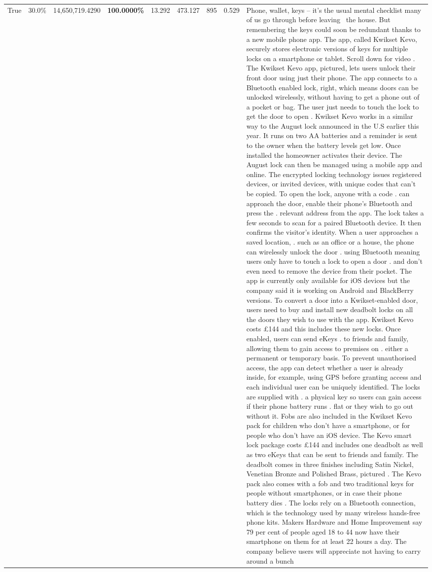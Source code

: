 \begin{table}[H]
\begin{tabular}{lllrlllll}
True & 30.0\% & 14,650,719.4290 & \bfseries \color{red} 100.0000\% & 13.292 & 473.127 & 895 & 0.529 & Phone, wallet, keys – it’s the usual mental checklist many of us go through before leaving  the house. But remembering the keys could soon be redundant thanks to a new mobile phone app. The app, called Kwikset Kevo, securely stores electronic versions of keys for multiple locks on a smartphone or tablet. Scroll down for video . The Kwikset Kevo app, pictured, lets users unlock their front door using just their phone. The app connects to a Bluetooth enabled lock, right, which means doors can be unlocked wirelessly, without having to get a phone out of a pocket or bag. The user just needs to touch the lock to get the door to open . Kwikset Kevo works in a similar way to the August lock announced in the U.S earlier this year. It runs on two AA batteries and a reminder is sent to the owner when the battery levels get low. Once installed the homeowner activates their device. The August lock can then be managed using a mobile app and online. The encrypted locking technology issues registered devices, or invited devices, with unique codes that can't be copied. To open the lock, anyone with a code . can approach the door, enable their phone's Bluetooth and press the . relevant address from the app. The lock takes a few seconds to scan for a paired Bluetooth device. It then confirms the visitor's identity. When a user approaches a saved location, . such as an office or a house, the phone can wirelessly unlock the door . using Bluetooth meaning users only have to touch a lock to open a door . and don't even need to remove the device from their pocket. The app is currently only available for iOS devices but the company said it is working on Android and BlackBerry versions. To convert a door into a Kwikset-enabled door, users need to buy and install new deadbolt locks on all the doors they wish to use with the app. Kwikset Kevo costs £144 and this includes these new locks. Once enabled, users can send eKeys . to friends and family, allowing them to gain access to premises on . either a permanent or temporary basis. To prevent unauthorised access, the app can detect whether a user is already inside, for example, using GPS before granting access and each individual user can be uniquely identified. The locks are supplied with . a physical key so users can gain access if their phone battery runs . flat or they wish to go out without it. Fobs are also included in the Kwikset Kevo pack for children who don't have a smartphone, or for people who don't have an iOS device. The Kevo smart lock package costs £144 and includes one deadbolt as well as two eKeys that can be sent to friends and family. The deadbolt comes in three finishes including Satin Nickel, Venetian Bronze and Polished Brass, pictured . The Kevo pack also comes with a fob and two traditional keys for people without smartphones, or in case their phone battery dies . The locks rely on a Bluetooth connection, which is the technology used by many wireless hands-free phone kits. Makers Hardware and Home Improvement say 79 per cent of people aged 18 to 44 now have their smartphone on them for at least 22 hours a day. The company believe users will appreciate not having to carry around a bunch 
\end{tabular}
\end{table}
